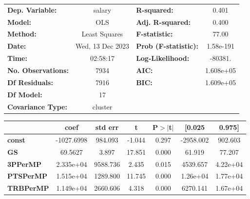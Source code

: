 \begin{center}
\begin{tabular}{lclc}
\toprule
\textbf{Dep. Variable:}             &      salary      & \textbf{  R-squared:         } &     0.401   \\
\textbf{Model:}                     &       OLS        & \textbf{  Adj. R-squared:    } &     0.400   \\
\textbf{Method:}                    &  Least Squares   & \textbf{  F-statistic:       } &     77.00   \\
\textbf{Date:}                      & Wed, 13 Dec 2023 & \textbf{  Prob (F-statistic):} & 1.58e-191   \\
\textbf{Time:}                      &     02:58:17     & \textbf{  Log-Likelihood:    } &   -80381.   \\
\textbf{No. Observations:}          &        7934      & \textbf{  AIC:               } & 1.608e+05   \\
\textbf{Df Residuals:}              &        7916      & \textbf{  BIC:               } & 1.609e+05   \\
\textbf{Df Model:}                  &          17      & \textbf{                     } &             \\
\textbf{Covariance Type:}           &     cluster      & \textbf{                     } &             \\
\bottomrule
\end{tabular}
\begin{tabular}{lcccccc}
                                    & \textbf{coef} & \textbf{std err} & \textbf{t} & \textbf{P$> |$t$|$} & \textbf{[0.025} & \textbf{0.975]}  \\
\midrule
\textbf{const}                      &   -1027.6998  &      984.093     &    -1.044  &         0.297        &    -2958.002    &      902.603     \\
\textbf{GS}                         &      69.5627  &        3.897     &    17.851  &         0.000        &       61.919    &       77.207     \\
\textbf{3PPerMP}                    &    2.335e+04  &     9588.736     &     2.435  &         0.015        &     4539.657    &     4.22e+04     \\
\textbf{PTSPerMP}                   &    1.515e+04  &     1289.800     &    11.745  &         0.000        &     1.26e+04    &     1.77e+04     \\
\textbf{TRBPerMP}                   &    1.149e+04  &     2660.606     &     4.318  &         0.000        &     6270.141    &     1.67e+04     \\

\end{tabular}
\end{center}
